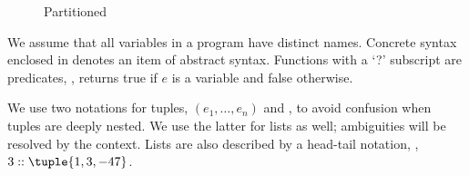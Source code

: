 \documentclass{LMCS}
\theoremstyle{definition} \newtheorem{property}[thm]{Property}
\begin{document}
\begin{figure}[!t]
  \caption{Partitioned \cps \label{fig:pcps}}
\end{figure}

We assume that all variables in a program have distinct names.
Concrete syntax enclosed in \denot{\cdot} denotes an item of abstract syntax.
Functions with a `?' subscript are predicates, \eg,  returns
true if $e$ is a variable and false otherwise.

We use two notations for tuples, $(e_1, \dots, e_n)$ and 
, to avoid confusion when tuples are deeply nested.
We use the latter for lists as well; ambiguities will be resolved by the 
context.
Lists are also described by a head-tail notation, \eg, $3::\tuple{1, 3, -47}$.
\end{document}
